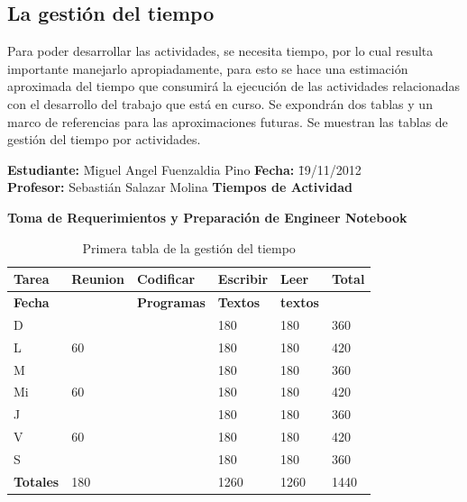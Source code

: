 \documentclass[a4paper,12pt,openany,oneside]{book}
\begin{document}
\subsection{La gestión del tiempo}
Para poder desarrollar las actividades, se necesita tiempo, por lo cual resulta importante manejarlo apropiadamente, para esto se hace una estimación aproximada del tiempo que consumirá la ejecución de las actividades relacionadas con el desarrollo del trabajo que está en curso. Se expondrán dos tablas y un marco de referencias para las aproximaciones futuras. Se muestran las tablas de gestión del tiempo por actividades.
\begin{table}
\begin{tabbing}
\textbf{Estudiante:} \= Miguel Angel Fuenzaldia Pino \= \textbf{Fecha:} \= 19/11/2012\\
\textbf{Profesor:} \> Sebastián Salazar Molina \> \textbf{Tiempos de Actividad} \>  \\
\end{tabbing}
\textbf{Toma de Requerimientos y Preparación de Engineer Notebook}\\
\begin{tabular}{| l | l | l | l | l | l |}
\hline
\textbf{Tarea} & \textbf{Reunion} & \textbf{Codificar} & \textbf{Escribir} & \textbf{Leer} & \textbf{Total} \\
\hline
\textbf{Fecha} &                  & \textbf{Programas} & \textbf{Textos} & \textbf{textos} & \\
\hline
D  &    & & 180 & 180 & 360 \\
\hline
L  & 60 & & 180 & 180 & 420 \\
\hline
M  &    & & 180 & 180 & 360 \\
\hline
Mi & 60 & & 180 & 180 & 420 \\
\hline
J  &    & & 180 & 180 & 360 \\
\hline
V  & 60 & & 180 & 180 & 420 \\
\hline
S  &    & & 180 & 180 & 360 \\
\hline
\textbf{Totales} & 180 & & 1260 & 1260 & 1440 \\
\hline
\end{tabular}
\caption{Primera tabla de la gestión del tiempo}
\end{table}
\end{document}
